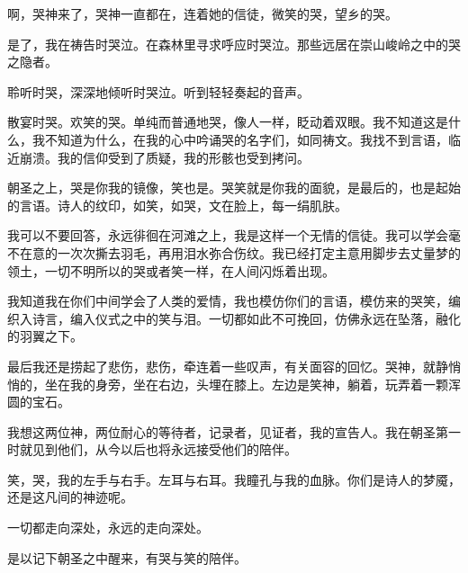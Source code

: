 \documentclass[UTF8]{article}
\begin{document}
\par 啊，哭神来了，哭神一直都在，连着她的信徒，微笑的哭，望乡的哭。
\\[0.6cm]
\par 是了，我在祷告时哭泣。在森林里寻求呼应时哭泣。那些远居在崇山峻岭之中的哭之隐者。
\par 聆听时哭，深深地倾听时哭泣。听到轻轻奏起的音声。
\par 散宴时哭。欢笑的哭。单纯而普通地哭，像人一样，眨动着双眼。我不知道这是什么，我不知道为什么，在我的心中吟诵哭的名字们，如同祷文。我找不到言语，临近崩溃。我的信仰受到了质疑，我的形骸也受到拷问。
\par 朝圣之上，哭是你我的镜像，笑也是。哭笑就是你我的面貌，是最后的，也是起始的言语。诗人的纹印，如笑，如哭，文在脸上，每一绢肌肤。
\par 我可以不要回答，永远徘徊在河滩之上，我是这样一个无情的信徒。我可以学会毫不在意的一次次撕去羽毛，再用泪水弥合伤纹。我已经打定主意用脚步去丈量梦的领土，一切不明所以的哭或者笑一样，在人间闪烁着出现。
\par 我知道我在你们中间学会了人类的爱情，我也模仿你们的言语，模仿来的哭笑，编织入诗言，编入仪式之中的笑与泪。一切都如此不可挽回，仿佛永远在坠落，融化的羽翼之下。
\par 最后我还是捞起了悲伤，悲伤，牵连着一些叹声，有关面容的回忆。哭神，就静悄悄的，坐在我的身旁，坐在右边，头埋在膝上。左边是笑神，躺着，玩弄着一颗浑圆的宝石。
\par 我想这两位神，两位耐心的等待者，记录者，见证者，我的宣告人。我在朝圣第一时就见到他们，从今以后也将永远接受他们的陪伴。
\par 笑，哭，我的左手与右手。左耳与右耳。我瞳孔与我的血脉。你们是诗人的梦魇，还是这凡间的神迹呢。
\par 一切都走向深处，永远的走向深处。
\par 是以记下朝圣之中醒来，有哭与笑的陪伴。
\end{document}
